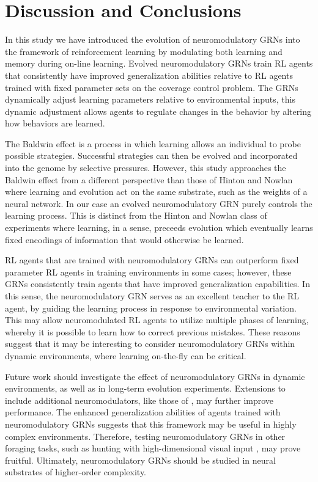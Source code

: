 \documentclass[conference]{IEEEtran}
\begin{document}

\section{Discussion and Conclusions}

In this study we have introduced the evolution of neuromodulatory GRNs into the
framework of reinforcement learning by modulating both learning and memory
during on-line learning. Evolved neuromodulatory GRNs train RL agents that
consistently have improved generalization abilities relative to RL agents
trained with fixed parameter sets on the coverage control problem. The GRNs
dynamically adjust learning parameters relative to environmental inputs,
this dynamic adjustment allows agents to regulate changes in the behavior
by altering how behaviors are learned.

The Baldwin effect is a process in which learning allows an individual to
probe possible strategies. Successful strategies can then be evolved and incorporated into the genome by
selective pressures. However, this study approaches the Baldwin effect from
a different perspective than those of Hinton and Nowlan where
learning and evolution act on the same substrate, such as the weights of a 
neural network. In our case an evolved neuromodulatory GRN purely controls the learning
process. This is distinct from the Hinton and Nowlan class of experiments where learning,
in a sense, preceeds evolution which eventually learns fixed encodings of information
that would otherwise be learned. 

RL agents that are trained with neuromodulatory GRNs can outperform fixed parameter
RL agents in training environments in some cases; however, these GRNs consistently
train agents that have improved generalization capabilities. In this sense, the
neuromodulatory GRN serves as an excellent teacher to the RL agent, by guiding
the learning process in response to environmental variation. This may allow 
neuromodulated RL agents to utilize multiple phases of learning, whereby 
it is possible to learn how to correct previous mistakes. These reasons suggest
that it may be interesting to consider neuromodulatory GRNs within dynamic
environments, where learning on-the-fly can be critical.

Future work should investigate the effect of neuromodulatory GRNs in dynamic
environments, as well as in long-term evolution experiments. Extensions to
include additional neuromodulators, like those of \cite{Doya2002}, may further
improve performance. The enhanced generalization abilities of agents trained
with neuromodulatory GRNs suggests that this framework may be
useful in highly complex environments. Therefore, testing neuromodulatory GRNs
in other foraging tasks, such as hunting with high-dimensional visual input
\cite{Palmer2012}, may prove fruitful. Ultimately, neuromodulatory GRNs should
be studied in neural substrates of higher-order complexity.
\end{document}
